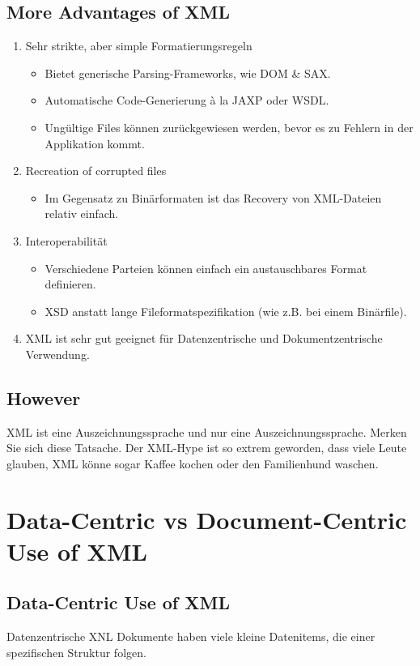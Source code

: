 \subsection{More Advantages of XML}
\begin{enumerate}
\item Sehr strikte, aber simple Formatierungsregeln
\begin{itemize}
\item Bietet generische Parsing-Frameworks, wie DOM \& SAX.
\item Automatische Code-Generierung à la JAXP oder WSDL.
\item Ungültige Files können zurückgewiesen werden, bevor es zu Fehlern in der Applikation kommt.
\end{itemize}
\item Recreation of corrupted files
\begin{itemize}
\item Im Gegensatz zu Binärformaten ist das Recovery von XML-Dateien relativ einfach.
\end{itemize}
\item Interoperabilität
\begin{itemize}
\item Verschiedene Parteien können einfach ein austauschbares Format definieren.
\item XSD anstatt lange Fileformatspezifikation (wie z.B. bei einem Binärfile).
\end{itemize}
\item XML ist sehr gut geeignet für Datenzentrische und Dokumentzentrische Verwendung.
\end{enumerate}

\subsection{However}
XML ist eine Auszeichnungssprache und nur eine Auszeichnungssprache. Merken Sie sich diese Tatsache.
Der XML-Hype ist so extrem geworden, dass viele Leute glauben, XML könne sogar Kaffee kochen oder den Familienhund waschen.
\section{Data-Centric vs Document-Centric Use of XML}
\subsection{Data-Centric Use of XML}
Datenzentrische XNL Dokumente haben viele kleine Datenitems, die einer spezifischen Struktur folgen.


